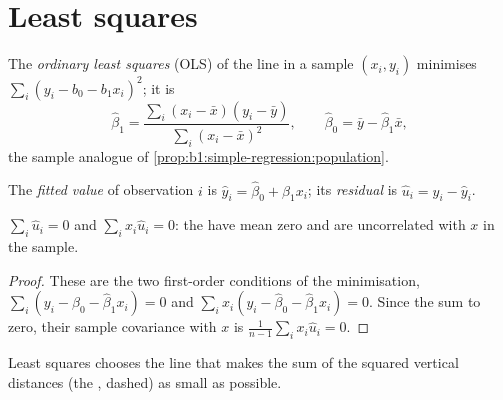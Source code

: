 \section{Least squares}\label{sec:b1:simple-regression:ols}

\begin{definition}\label{def:b1:simple-regression:ols}
The \emph{ordinary least squares} (OLS)  of the line in a sample $(x_i, y_i)$ minimises
$\sum_i (y_i - b_0 - b_1x_i)^2$; it is
\[
  \hat\beta_1 = \frac{\sum_i (x_i - \bar x)(y_i - \bar y)}{\sum_i (x_i - \bar x)^2}, \qquad \hat\beta_0 = \bar y - \hat\beta_1\bar x,
\]
the sample analogue of \cref{prop:b1:simple-regression:population}.
\end{definition}

\begin{definition}\label{def:b1:simple-regression:residual}
The \emph{fitted value} of observation $i$ is $\hat y_i = \hat\beta_0 + \hat\beta_1x_i$; its \emph{residual} is
$\hat u_i = y_i - \hat y_i$.
\end{definition}

\begin{proposition}[Residuals]\label{prop:b1:simple-regression:residuals}
$\sum_i \hat u_i = 0$ and $\sum_i x_i\hat u_i = 0$: the  have mean zero and are
uncorrelated with $x$ in the sample.
\end{proposition}

\begin{proof}
These are the two first-order conditions of the minimisation, $\sum_i (y_i - \hat\beta_0 - \hat\beta_1x_i) = 0$
and $\sum_i x_i(y_i - \hat\beta_0 - \hat\beta_1x_i) = 0$. Since the  sum to zero, their sample
covariance with $x$ is $\frac1{n-1}\sum_i x_i\hat u_i = 0$.
\end{proof}

\begin{omfigure}

{\small Least squares chooses the line that makes the sum of the squared
vertical distances (the , dashed) as small as possible.}
\end{omfigure}

